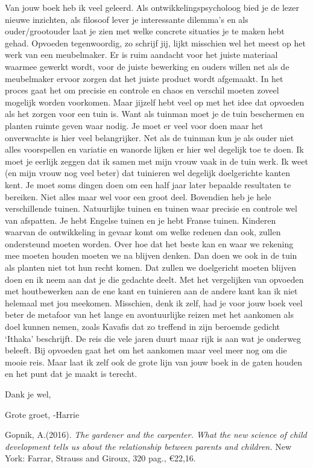 \documentclass[]{book}
\begin{document}
Van jouw boek heb ik veel geleerd. Als ontwikkelingspsycholoog bied je
de lezer nieuwe inzichten, als filosoof lever je interessante dilemma's
en als ouder/grootouder laat je zien met welke concrete situaties je te
maken hebt gehad. Opvoeden tegenwoordig, zo schrijf jij, lijkt misschien
wel het meest op het werk van een meubelmaker. Er is ruim aandacht voor
het juiste materiaal waarmee gewerkt wordt, voor de juiste bewerking en
ouders willen net als de meubelmaker ervoor zorgen dat het juiste
product wordt afgemaakt. In het proces gaat het om precisie en controle
en chaos en verschil moeten zoveel mogelijk worden voorkomen. Maar
jijzelf hebt veel op met het idee dat opvoeden als het zorgen voor een
tuin is. Want als tuinman moet je de tuin beschermen en planten ruimte
geven waar nodig. Je moet er veel voor doen maar het onverwachte is hier
veel belangrijker. Net als de tuinman kun je als ouder niet alles
voorspellen en variatie en wanorde lijken er hier wel degelijk toe te
doen. Ik moet je eerlijk zeggen dat ik samen met mijn vrouw vaak in de
tuin werk. Ik weet (en mijn vrouw nog veel beter) dat tuinieren wel
degelijk doelgerichte kanten kent. Je moet soms dingen doen om een half
jaar later bepaalde resultaten te bereiken. Niet alles maar wel voor een
groot deel. Bovendien heb je hele verschillende tuinen. Natuurlijke
tuinen en tuinen waar precisie en controle wel van afspatten. Je hebt
Engelse tuinen en je hebt Franse tuinen. Kinderen waarvan de
ontwikkeling in gevaar komt om welke redenen dan ook, zullen ondersteund
moeten worden. Over hoe dat het beste kan en waar we rekening mee moeten
houden moeten we na blijven denken. Dan doen we ook in de tuin als
planten niet tot hun recht komen. Dat zullen we doelgericht moeten
blijven doen en ik neem aan dat je die gedachte deelt. Met het
vergelijken van opvoeden met houtbewerken aan de ene kant en tuinieren
aan de andere kant kan ik niet helemaal met jou meekomen. Misschien,
denk ik zelf, had je voor jouw boek veel beter de metafoor van het lange
en avontuurlijke reizen met het aankomen als doel kunnen nemen, zoals
Kavafis dat zo treffend in zijn beroemde gedicht `Ithaka' beschrijft. De
reis die vele jaren duurt maar rijk is aan wat je onderweg beleeft. Bij
opvoeden gaat het om het aankomen maar veel meer nog om die mooie reis.
Maar laat ik zelf ook de grote lijn van jouw boek in de gaten houden en
het punt dat je maakt is terecht.

Dank je wel,

Grote groet, -Harrie

Gopnik, A.(2016). \emph{The gardener and the carpenter. What the new
science of child development tells us about the relationship between
parents and children.} New York: Farrar, Strauss and Giroux, 320 pag.,
€22,16.


\end{document}
